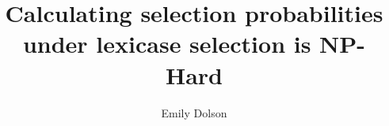 \documentclass[sigconf]{acmart}
\begin{document}
\title{Calculating selection probabilities under lexicase selection is NP-Hard}


\author{Emily Dolson}

\renewcommand{\shortauthors}{Shahbandegan and Dolson}

\begin{abstract}
\end{abstract}


\end{document}
